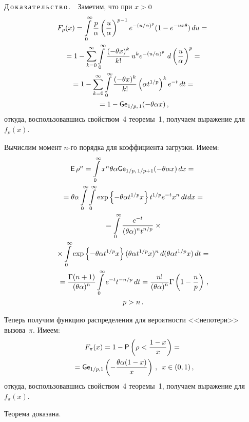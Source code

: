 \begin{multicols}{2}
\noindent
Д\,о\,к\,а\,з\,а\,т\,е\,л\,ь\,с\,т\,в\,о\,.\ \ Заметим, что при $x\hm>0$
\begin{multline*}
F_\rho(x) =
\int\limits_0^{\infty}  \fr{p}{\alpha}\left(
\fr{u}{\alpha}\right)^{p-1}e^{-(u/\alpha)^{p}}(1-e^{-ux\theta})\, du={}\\
{}= 1 - \sum\limits_{k=0}^\infty \int\limits_0^{\infty} 
\fr{(-\theta x)^k}{k!}\,u^k e^{-\left(u/\alpha\right)^p} \ d\left(\fr{u}{\alpha}\right)^p ={}\\
{}=
1 - \sum\limits_{k=0}^\infty \int\limits_0^{\infty} 
\fr{(-\theta x)^k}{k!} \left(\alpha t^{1/p}\right)^{k}e^{-t} \, dt ={}\\
{}= 1 - \G_{1/p,\, 1}(-\theta \alpha x)\,,
\end{multline*}
откуда, воспользовавшись свойством~4 теоремы~1, получаем выражение для~$f_\rho(x)$.

Вычислим момент $n$-го порядка для коэффициента загрузки. Имеем:
\begin{multline*}
{\sf E}\,\rho^n = \int\limits_0^\infty x^n \theta \alpha {\sf Ge}_{1/p,\, 1/p+1}
(-\theta \alpha x) \, dx = {}\\
{} = \theta \alpha \int\limits_0^\infty \int\limits_0^{\infty} 
\exp \left\lbrace -\theta \alpha t^{1/p}x\right\rbrace t^{1/p}e^{-t} x^{n}\, dt  dx={}\\
{}=\int\limits_0^\infty \displaystyle\frac{\displaystyle e^{-t}\mathstrut}{\displaystyle (\theta \alpha)^n t^{n/p}\mathstrut} \times{}\\
{}\times
\int\limits_0^{\infty} \exp \left\lbrace -\theta \alpha t^{1/p}x\right\rbrace 
(\theta \alpha t^{1/p} x)^n \, d(\theta \alpha t^{1/p} x) \, dt={}\\
{}= \displaystyle\frac{\displaystyle \Gamma(n+1)\mathstrut}{\displaystyle {(\theta \alpha)^n}\mathstrut}\int\limits_0^\infty e^{-t}t^{-n/p}  \, dt 
= \displaystyle\frac{\displaystyle n!\mathstrut}{\displaystyle {(\theta \alpha)^n}\mathstrut}\Gamma\left(
1-\displaystyle\frac{\displaystyle n\mathstrut}{\displaystyle {p}\mathstrut}\right)\,, \\
 p>n\,.
\end{multline*}

Теперь получим функцию распределения для вероятности <<непотери>> вызова~$\pi$. Имеем:
\begin{multline*}
F_\pi(x) =  1 - {\sf P}\left(\rho<\displaystyle\frac{\displaystyle {1-x}\mathstrut}{\displaystyle {x}\mathstrut}\right) ={}\\
{}=
  {\sf Ge}_{1/p, 1}\left(-\displaystyle\frac{\displaystyle \theta \alpha (1-x)\mathstrut}{\displaystyle x\mathstrut}\right)\,,\enskip
  x\in(0,1)\,,
\end{multline*}
откуда, воспользовавшись свойством~4 теоремы~1, получаем выражение для $f_\pi(x)$.

Теорема доказана.

\smallskip



\end{multicols}
